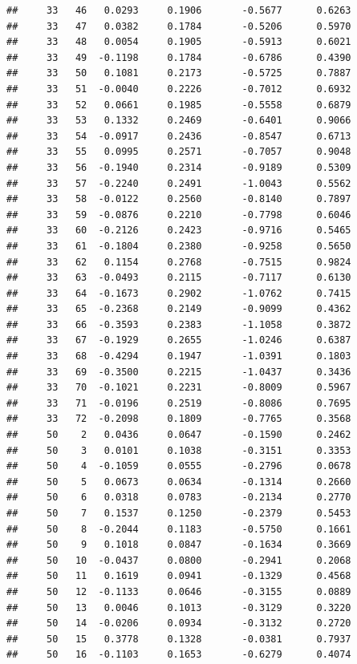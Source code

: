 \documentclass[
]{article}
\begin{document}
\begin{verbatim}
##     33   46   0.0293     0.1906       -0.5677      0.6263  
##     33   47   0.0382     0.1784       -0.5206      0.5970  
##     33   48   0.0054     0.1905       -0.5913      0.6021  
##     33   49  -0.1198     0.1784       -0.6786      0.4390  
##     33   50   0.1081     0.2173       -0.5725      0.7887  
##     33   51  -0.0040     0.2226       -0.7012      0.6932  
##     33   52   0.0661     0.1985       -0.5558      0.6879  
##     33   53   0.1332     0.2469       -0.6401      0.9066  
##     33   54  -0.0917     0.2436       -0.8547      0.6713  
##     33   55   0.0995     0.2571       -0.7057      0.9048  
##     33   56  -0.1940     0.2314       -0.9189      0.5309  
##     33   57  -0.2240     0.2491       -1.0043      0.5562  
##     33   58  -0.0122     0.2560       -0.8140      0.7897  
##     33   59  -0.0876     0.2210       -0.7798      0.6046  
##     33   60  -0.2126     0.2423       -0.9716      0.5465  
##     33   61  -0.1804     0.2380       -0.9258      0.5650  
##     33   62   0.1154     0.2768       -0.7515      0.9824  
##     33   63  -0.0493     0.2115       -0.7117      0.6130  
##     33   64  -0.1673     0.2902       -1.0762      0.7415  
##     33   65  -0.2368     0.2149       -0.9099      0.4362  
##     33   66  -0.3593     0.2383       -1.1058      0.3872  
##     33   67  -0.1929     0.2655       -1.0246      0.6387  
##     33   68  -0.4294     0.1947       -1.0391      0.1803  
##     33   69  -0.3500     0.2215       -1.0437      0.3436  
##     33   70  -0.1021     0.2231       -0.8009      0.5967  
##     33   71  -0.0196     0.2519       -0.8086      0.7695  
##     33   72  -0.2098     0.1809       -0.7765      0.3568  
##     50    2   0.0436     0.0647       -0.1590      0.2462  
##     50    3   0.0101     0.1038       -0.3151      0.3353  
##     50    4  -0.1059     0.0555       -0.2796      0.0678  
##     50    5   0.0673     0.0634       -0.1314      0.2660  
##     50    6   0.0318     0.0783       -0.2134      0.2770  
##     50    7   0.1537     0.1250       -0.2379      0.5453  
##     50    8  -0.2044     0.1183       -0.5750      0.1661  
##     50    9   0.1018     0.0847       -0.1634      0.3669  
##     50   10  -0.0437     0.0800       -0.2941      0.2068  
##     50   11   0.1619     0.0941       -0.1329      0.4568  
##     50   12  -0.1133     0.0646       -0.3155      0.0889  
##     50   13   0.0046     0.1013       -0.3129      0.3220  
##     50   14  -0.0206     0.0934       -0.3132      0.2720  
##     50   15   0.3778     0.1328       -0.0381      0.7937  
##     50   16  -0.1103     0.1653       -0.6279      0.4074  

\end{verbatim}
\end{document}
